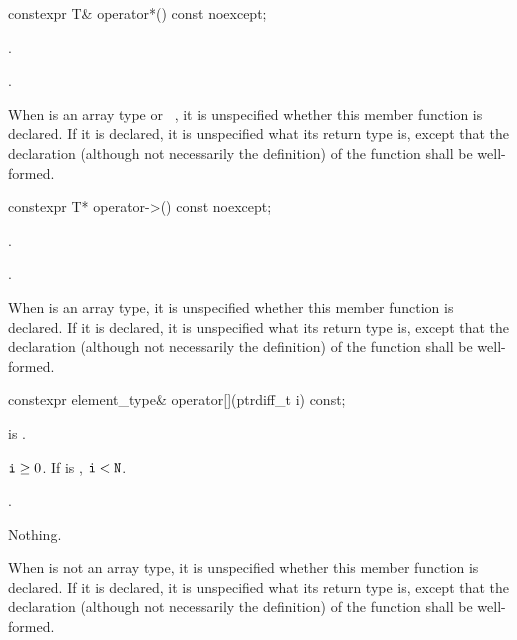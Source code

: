 %
\begin{itemdecl}
constexpr T& operator*() const noexcept;
\end{itemdecl}

\begin{itemdescr}
\pnum
\expects
{}.

\pnum
\returns
{}.

\pnum
\remarks
When  is an array type or \cv{}~,
it is unspecified whether this
member function is declared. If it is declared, it is unspecified what its
return type is, except that the declaration (although not necessarily the
definition) of the function shall be well-formed.
\end{itemdescr}

%
\begin{itemdecl}
constexpr T* operator->() const noexcept;
\end{itemdecl}

\begin{itemdescr}
\pnum
\expects
{}.

\pnum
\returns
{}.

\pnum
\remarks
When  is an array type,
it is unspecified whether this member function is declared.
If it is declared, it is unspecified what its return type is,
except that the declaration (although not necessarily the definition)
of the function shall be well-formed.
\end{itemdescr}

%
\begin{itemdecl}
constexpr element_type& operator[](ptrdiff_t i) const;
\end{itemdecl}

\begin{itemdescr}
\pnum
\expects
{} is .

\pnum
\hardexpects
$\texttt{\protect i} \ge 0$. If  is , $\texttt{\protect i} < \texttt{\protect N}$.

\pnum
\returns
{}.

\pnum
\throws
Nothing.

\pnum
\remarks
When  is not an array type,
it is unspecified whether this member function is declared.
If it is declared, it is unspecified what its return type is,
except that the declaration (although not necessarily the definition)
of the function shall be well-formed.
\end{itemdescr}

